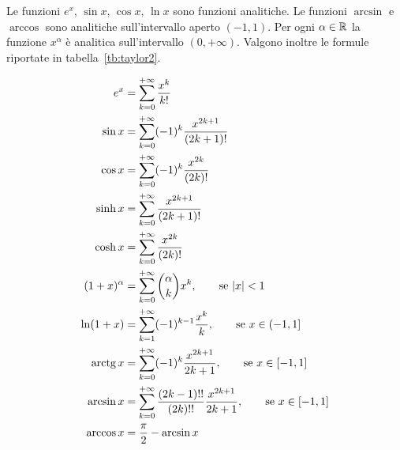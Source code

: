 \begin{theorem}
  \label{th:serie_taylor}
  Le funzioni $e^x$, $\sin x$, $\cos x$, $\ln x$ sono funzioni
  analitiche. Le funzioni $\arcsin$ e $\arccos$ sono analitiche sull'intervallo
  aperto $(-1,1)$. Per ogni $\alpha \in {\mathbb R}$
  la funzione $x^\alpha$ è analitica sull'intervallo $(0,+\infty)$.
  Valgono inoltre le formule riportate in tabella~\ref{tb:taylor2}.
\end{theorem}
%
\begin{table}
\begin{align*}
e^x &= \sum_{k=0}^{+\infty} \frac{x^k}{k!}\\
\sin x &= \sum_{k=0}^{+\infty} (-1)^k\frac{x^{2k+1}}{(2k+1)!}\\
\cos x &= \sum_{k=0}^{+\infty} (-1)^k\frac{x^{2k}}{(2k)!}\\
\sinh x &= \sum_{k=0}^{+\infty} \frac{x^{2k+1}}{(2k+1)!}\\
\cosh x &= \sum_{k=0}^{+\infty} \frac{x^{2k}}{(2k)!} \\
(1+x)^\alpha &= \sum_{k=0}^{+\infty} {\alpha \choose k} x^k, \qquad \text{se ${\left|x\right|}<1$} \\
\ln (1+x) &= \sum_{k=1}^{+\infty} (-1)^{k-1} \frac{x^k}{k}, \qquad \text{se $x\in(-1,1]$} \\
\operatorname{arctg} x &= \sum_{k=0}^{+\infty} (-1)^k \frac{x^{2k+1}}{2k+1}, \qquad \text{se $x\in [-1,1]$} \\
\arcsin x &= \sum_{k=0}^{+\infty} \frac{(2k-1)!!}{(2k)!!} \frac{x^{2k+1}}{2k+1}, 
  \qquad \text{se $x\in[-1,1]$} \\
\arccos x &= \frac \pi 2 - \arcsin x
\end{align*}
\caption{sviluppi in serie di Taylor, di alcune funzioni elementari.
%
%
Si veda il teorema~\ref{th:serie_taylor}.}
\label{tb:taylor2}%
\end{table}
%
